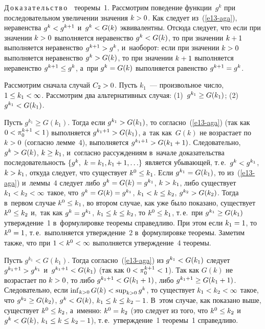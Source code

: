 \begin{multicols}{2}
{\smallskip

\noindent
  Д\,о\,к\,а\,з\,а\,т\,е\,л\,ь\,с\,т\,в\,о\ \ теоремы~1. Рассмотрим 
поведение функции~$g^k$ при последовательном увеличении значения 
$k\hm>0$. Как следует из~(\ref{e13-aga}), неравенства $g^k\hm< g^{k+1}$ 
и~$g^k\hm< G(k)$ эквивалентны. Отсюда следует, что если при значении 
$k\hm> 0$ выполняется неравенство $g^k\hm< G(k)$, то при значении $k\hm+1$ 
выполняется неравенство $g^{k+1}\hm> g^k$, и~наоборот: если при значении 
$k\hm>0$ выполняется неравенство $g^k\hm> G(k)$, то при значении $k\hm+1$ 
выполняется неравенство $g^{k+1}\hm\leq g^k$, а~при $g^k\hm= G(k)$ 
выполняется равенство $g^{k+1}\hm= g^k$. 
  
  Рассмотрим сначала случай $C_2\hm>0$. Пусть $k_1$~--- произвольное 
число, $1\hm\leq k_1 \hm< \infty$. Рассмотрим два альтернативных случая: 
(1)~$g^{k_1}\hm\geq G(k_1)$; (2)~$g^{k_1}\hm< G(k_1)$. 
  
  Пусть $g^{k_1}\geq G(k_1)$. Тогда если $g^{k_1}\hm> G(k_1)$, то 
согласно~(\ref{e13-aga}) (так как $0\hm< \pi_0^{k+1}\hm<1$) выполняется 
$g^{k_1+1}\hm> G(k_1)$, а~так как~$G(k)$ не возрастает по $k\hm>0$ 
(согласно лемме~4), выполняется $g^{k_1+1}\hm> G(k_1+1)$. Следовательно, 
$g^k\hm> G(k)$, $k\hm\geq k_1$, и~согласно рассуждениям в~начале 
доказательства последовательность $\{ g^k,\ k\hm= k_1, k_1+1, \ldots\}$ 
является убывающей, т.\,е.\ $g^k\hm< g^{k_1}$, $k\hm> k_1$, откуда следует, 
что существует $k^0\hm\leq k_1$. Если $g^{k_1}\hm= G(k_1)$, то  
из~(\ref{e13-aga}) и~леммы~4 следует либо $g^k\hm= G(k)\hm= g^{k_1}$, 
$k\hm> k_1$, либо существует $k_1\hm< k_2\hm< \infty$ такое, что $g^k\hm= 
G(k)\hm= g^{k_1}$, $k_1\hm< k\hm\leq k_2$, $g^{k_2}\hm> G(k_2)$. Тогда 
в~первом случае $k^0\hm\leq k_1$, во втором случае, как уже было показано, 
существует $k^0\hm\leq k_2$ и,~так как $g^k\hm= g^{k_1}$, $k_1\hm\leq 
k\hm\leq k_2$, то $k^0\hm\leq k_1$, т.\,е.\ при $g^{k_1}\hm\geq G(k_1)$ 
утверждение~1 в~формулировке теоремы справедливо. При этом если 
$k_1\hm=1$, то $k^0\hm=1$, т.\,е.\ выполняется утверждение~2 в~формулировке 
теоремы. Заметим также, что при $1\hm< k^0\hm< \infty$ выполняется 
утверждение~4 теоремы.
  
  Пусть $g^{k_1}<G(k_1)$. Тогда согласно~(\ref{e13-aga}) из $g^{k_1}\hm< 
G(k_1)$ следует $g^{k_1+1}\hm> g^{k_1}$ и~$g^{k_1+1}\hm< G(k_1)$ (так как 
$0\hm< \pi_0^{k+1}\hm< 1$). Так как $G(k)$ не возрастает по $k\hm> 0$, то 
либо $g^{k_1+1}\hm< G(k_1+1)$, либо $g^{k_1+1}\hm\geq G(k_1+1)$. 
Следовательно, если $\mathop{\mathrm{inf}}\nolimits_{k>0} G(k)\hm< 
\mathop{\mathrm{sup}}\nolimits_{k>0} g^k$, то существует 
$k_1\hm<k_2\hm<\infty$ такое, 
что $g^{k_2}\hm\geq G(k_2)$, $g^k\hm< G(k)$, $k_1\hm\leq k\hm\leq k_2\hm-1$. 
В~этом случае, как показано выше, существует $k^0\hm\leq k_2$, а~именно: 
$k^0\hm=k_2$ (это следует из того, что $k^0\hm\leq k_2$ и~$g^k\hm< G(k)$, 
$k_1\hm\leq k\hm\leq k_2\hm-1$), т.\,е.\ утверждение~1 теоремы~1 справедливо. 

}
\end{multicols}
